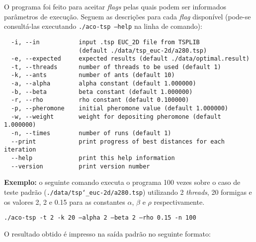 \documentclass[a4paper, twoside, 12pt]{article}
\begin{document}
O programa foi feito para aceitar \textit{flags} pelas quais podem ser informados parâmetros de execução. Seguem as descrições para cada \textit{flag} disponível (pode-se consultá-las executando \texttt{./aco-tsp --help} na linha de comando):

\begin{verbatim}
  -i, --in           input .tsp EUC_2D file from TSPLIB
                     (default ./data/tsp_euc-2d/a280.tsp)
  -e, --expected     expected results (default ./data/optimal.result)
  -t, --threads      number of threads to be used (default 1)
  -k, --ants         number of ants (default 10)
  -a, --alpha        alpha constant (default 1.000000)
  -b, --beta         beta constant (default 1.000000)
  -r, --rho          rho constant (default 0.100000)
  -p, --pheromone    initial pheromone value (default 1.000000)
  -w, --weight       weight for depositing pheromone (default 1.000000)
  -n, --times        number of runs (default 1)
  --print            print progress of best distances for each iteration
  --help             print this help information
  --version          print version number
\end{verbatim}

\textbf{Exemplo:} o seguinte comando executa o programa 100 vezes sobre o caso de teste padrão (\texttt{./data/tsp\char`_euc-2d/a280.tsp}) utilizando 2 \textit{threads}, 20 formigas e os valores 2, 2 e 0.15 para as constantes $\alpha$, $\beta$ e $\rho$ respectivamente.

\texttt{./aco-tsp -t 2 -k 20 --alpha 2 --beta 2 --rho 0.15 -n 100}

O resultado obtido é impresso na saída padrão no seguinte formato:
\end{document}
